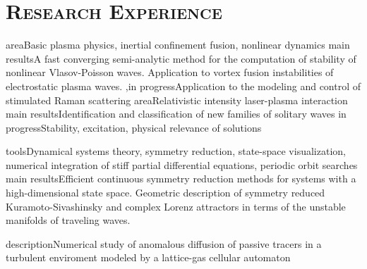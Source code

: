 \documentclass[11pt,a4paper,final]{moderncv}
\begin{document}
\section{\textsc{Research Experience}}
		{area}{Basic plasma physics, inertial confinement fusion, nonlinear dynamics}
		{main results}{A fast converging semi-analytic method for the computation of stability of nonlinear {Vlasov-Poisson} waves.
				Application to vortex fusion instabilities of electrostatic plasma waves.}
		{\sep in progress}{Application to the modeling and control of stimulated Raman scattering}
		{area}{Relativistic intensity laser-plasma interaction}
		{main results}{Identification and classification of new families of solitary waves}
		{in progress}{Stability, excitation, physical relevance of solutions}{}{}
\clearpage

		{tools}{Dynamical systems theory, symmetry reduction, state-space visualization, numerical integration of stiff partial differential equations, periodic orbit searches}
		{main results}{Efficient continuous symmetry reduction methods for systems with a high-dimensional state space.
				Geometric description of symmetry reduced Kuramoto-Sivashinsky and complex Lorenz attractors 
				in terms of the unstable manifolds of traveling waves.
				}

{description}{Numerical study of anomalous diffusion of passive tracers in a turbulent enviroment modeled by
	      a lattice-gas cellular automaton}
\end{document}
